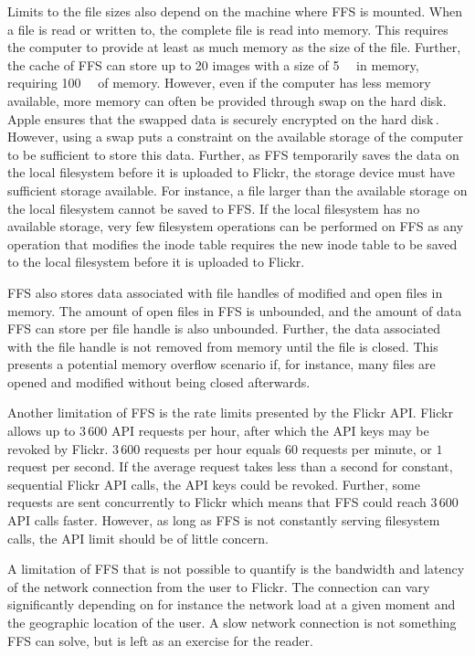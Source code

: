 Limits to the file sizes also depend on the machine where \gls{FFS} is mounted. When a file is read or written to, the complete file is read into memory. This requires the computer to provide at least as much memory as the size of the file. Further, the cache of \gls{FFS} can store up to 20 images with a size of \SI{5}{\mega\byte} in memory, requiring \SI{100}{\mega\byte} of memory. However, even if the computer has less memory available, more memory can often be provided through swap on the hard disk. Apple ensures that the swapped data is securely encrypted on the hard disk\,\cite{appleinc.WhatSecureVirtual}. However, using a swap puts a constraint on the available storage of the computer to be sufficient to store this data. Further, as \gls{FFS} temporarily saves the data on the local filesystem before it is uploaded to Flickr, the storage device must have sufficient storage available. For instance, a file larger than the available storage on the local filesystem cannot be saved to \gls{FFS}. If the local filesystem has no available storage, very few filesystem operations can be performed on \gls{FFS} as any operation that modifies the inode table requires the new inode table to be saved to the local filesystem before it is uploaded to Flickr. 

\gls{FFS} also stores data associated with file handles of modified and open files in memory. The amount of open files in \gls{FFS} is unbounded, and the amount of data \gls{FFS} can store per file handle is also unbounded. Further, the data associated with the file handle is not removed from memory until the file is closed. This presents a potential memory overflow scenario if, for instance, many files are opened and modified without being closed afterwards. 

Another limitation of \gls{FFS} is the rate limits presented by the Flickr \gls{API}. Flickr allows up to $3\,600$ \gls{API} requests per hour, after which the \gls{API} keys may be revoked by Flickr. $3\,600$ requests per hour equals $60$ requests per minute, or $1$ request per second. If the average request takes less than a second for constant, sequential Flickr \gls{API} calls, the \gls{API} keys could be revoked. Further, some requests are sent concurrently to Flickr which means that \gls{FFS} could reach $3\,600$ \gls{API} calls faster. However, as long as \gls{FFS} is not constantly serving filesystem calls, the \gls{API} limit should be of little concern.

A limitation of \gls{FFS} that is not possible to quantify is the bandwidth and latency of the network connection from the user to Flickr. The connection can vary significantly depending on for instance the network load at a given moment and the geographic location of the user. A slow network connection is not something \gls{FFS} can solve, but is left as an exercise for the reader.

